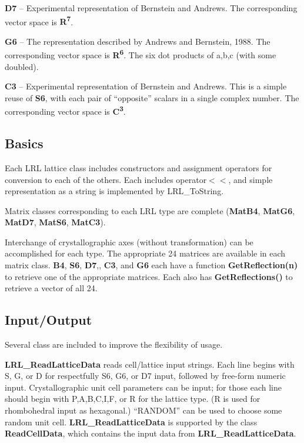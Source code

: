 \documentclass[11pt]{article} %
\begin{document}
\textbf{D7} – Experimental representation of Bernstein and Andrews. The corresponding vector space is \textbf{R\textsuperscript{7}}.

\textbf{G6} – The representation described by Andrews and Bernstein, 1988. The corresponding vector space is \textbf{R\textsuperscript{6}}. The six dot products of a,b,c (with some doubled).

\textbf{C3} – Experimental representation of Bernstein and Andrews. This is a simple reuse of \textbf{S6}, with each pair of ``opposite'' scalars in a single complex number. The corresponding vector space is \textbf{C\textsuperscript{3}}.


\subsection{Basics}

Each LRL lattice class includes constructors and assignment operators for conversion to each of the others. Each includes operator$<<$, and simple representation as a string is implemented by LRL\_ToString.

Matrix classes corresponding to each LRL type are complete (\textbf{MatB4}, \textbf{MatG6}, \textbf{MatD7}, \textbf{MatS6}, \textbf{MatC3}).

Interchange of crystallographic axes (without transformation) can be accomplished for each type. The appropriate 24 matrices are available in each matrix class. \textbf{B4}, \textbf{S6}, \textbf{D7},, \textbf{C3}, and \textbf{G6} each have a function \textbf{GetReflection(n)} to retrieve one of the appropriate matrices. Each also has \textbf{GetReflections()} to retrieve a vector of all 24.

\subsection{Input/Output}

Several class are included to improve the flexibility of usage. 

\textbf{LRL\_ReadLatticeData} reads cell/lattice input strings. Each line begins with S, G, or D for respectfully S6, G6, or D7 input, followed by free-form numeric input. Crystallographic unit cell parameters can be input; for those each line should begin with P,A,B,C,I,F, or R for the lattice type. (R is used for rhombohedral input as hexagonal.) ``RANDOM'' can be used to choose some random unit cell. \textbf{LRL\_ReadLatticeData} is supported by the class\textbf{ ReadCellData}, which contains the input data from \textbf{LRL\_ReadLatticeData}.
\end{document}
